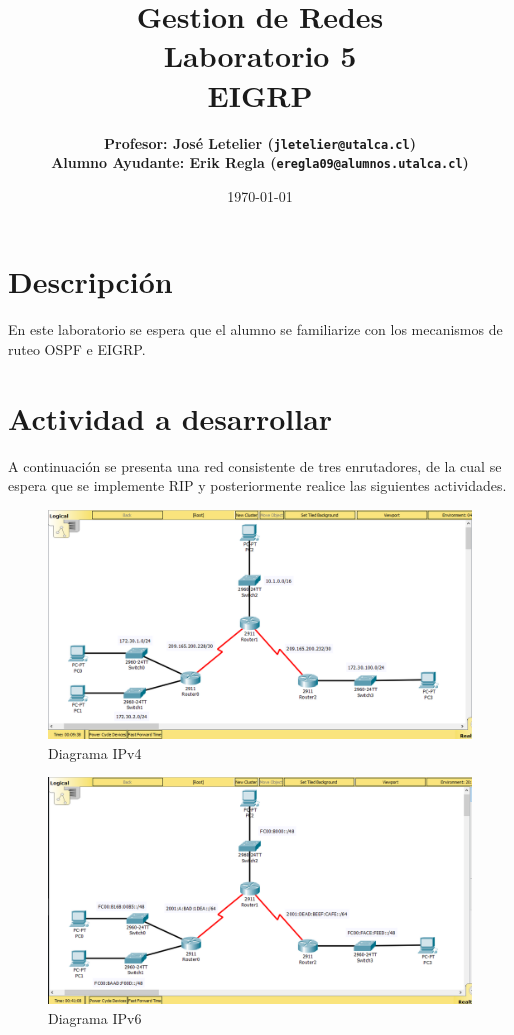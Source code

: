 \documentclass[11pt]{utalcaDoc}
\title{{\bf Gestion de Redes}\\Laboratorio 5\\EIGRP}
\author{
    \bf{Profesor:} José Letelier (\texttt{jletelier@utalca.cl})\\ 
    \bf{Alumno Ayudante:} Erik Regla (\texttt{eregla09@alumnos.utalca.cl})\\ }
\date{\today}
\begin{document}
\renewcommand{\figurename}{Figura~}
\renewcommand{\tablename}{Tabla~}

\maketitle

\section{Descripción}
En este laboratorio se espera que el alumno se familiarize con los mecanismos de ruteo OSPF e EIGRP.

\section{Actividad a desarrollar}

A continuación se presenta una red consistente de tres enrutadores, de la cual se espera que se implemente RIP y posteriormente realice las siguientes actividades.

\begin{figure}[!ht]
  \centering
\includegraphics[scale=.3]{ipv4} 
  \caption{Diagrama IPv4}
  \label{FIGURE:1}
\end{figure}

\begin{figure}[!ht]
  \centering
\includegraphics[scale=.3]{ipv6} 
  \caption{Diagrama IPv6}
  \label{FIGURE:2}
\end{figure}
\end{document}
